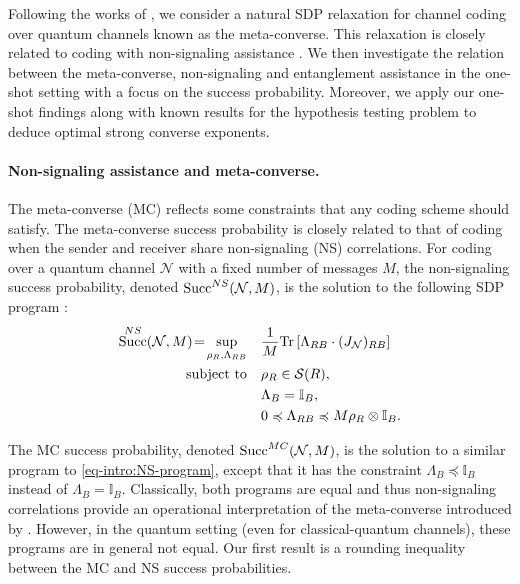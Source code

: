 \documentclass[a4paper,onecolumn,11pt,accepted=2025-10-01]{quantumarticle}
\DeclareMathOperator{\suc}{Succ}
\newcommand*{\cN}{\mathcal{N}}
\newcommand*{\cS}{\mathcal{S}}
\newcommand*{\tr}[1]{\mathrm{Tr}\left[#1\right]}
\newcommand*{\mle}{\preccurlyeq}
\begin{document}
Following the works of \cite{polyanskiy2010channel,matthews2012linear, Matthews2014Sep,barman2017algorithmic,Fawzi19}, we consider a natural SDP relaxation for channel coding over quantum channels known as the meta-converse. This relaxation is closely related to coding with non-signaling assistance \cite{Wang2019Feb}. We then investigate the relation between the meta-converse,  non-signaling and entanglement assistance in the one-shot setting with a focus on the success probability. Moreover, we apply our one-shot findings along with known results for the hypothesis testing problem to deduce optimal strong converse exponents.

\paragraph{Non-signaling assistance and meta-converse.} The meta-converse (MC) reflects some constraints that any coding scheme should satisfy.  The meta-converse success probability is closely related to that of coding when the sender and receiver share non-signaling (NS) correlations. For coding over a quantum channel $\cN$ with a fixed number of messages $M$, the non-signaling success probability, denoted $\suc^{\rm{NS}}(\cN, M)$, is the solution to the following SDP program \cite{Matthews2014Sep,Wang2019Feb}:
\begin{equation}\label{eq-intro:NS-program}
    \begin{split}
\suc^{\rm{NS}}(\mathcal{N}, M)\!=\! 
\sup_{\rho_R, \Lambda_{RB}} \quad 
& \frac{1}{M} \tr{ \Lambda_{RB} \cdot (J_{\mathcal{N}})_{RB} }
\\
\text{subject to} \quad 
& \rho_R \in \mathcal{S}(R), \\
& \Lambda_B = \mathbb{I}_B, \\
& 0 \mle \Lambda_{RB} \mle M \rho_R \otimes \mathbb{I}_B.
\end{split}
\end{equation}


The MC success probability, denoted $\suc^{\rm{MC}}(\cN, M)$, is the solution to a similar program to \eqref{eq-intro:NS-program},  except that it has the constraint $\Lambda_B \mle  \mathbb{I}_B$ instead of $\Lambda_B = \mathbb{I}_B$. Classically, both programs are equal \cite{matthews2012linear} and thus non-signaling correlations provide an operational interpretation of the meta-converse introduced by \cite{polyanskiy2010channel}. However, in the quantum setting (even for classical-quantum channels), these programs are in general not equal. Our first result is a rounding inequality between the MC and NS success probabilities.
\end{document}
